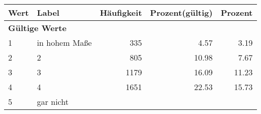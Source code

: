      \begin{longtable}{lXrrr}
     \toprule
     \textbf{Wert} & \textbf{Label} & \textbf{Häufigkeit} & \textbf{Prozent(gültig)} & \textbf{Prozent} \\
     \endhead
     \midrule
     \multicolumn{5}{l}{\textbf{Gültige Werte}}\\

     1 &
     \multicolumn{1}{X}{ in hohem Maße   } &


       \num{335} &
       \num[round-mode=places,round-precision=2]{4,57} &
         \num[round-mode=places,round-precision=2]{3,19} \\

     2 &
     \multicolumn{1}{X}{ 2   } &


       \num{805} &
       \num[round-mode=places,round-precision=2]{10,98} &
         \num[round-mode=places,round-precision=2]{7,67} \\

     3 &
     \multicolumn{1}{X}{ 3   } &


       \num{1179} &
       \num[round-mode=places,round-precision=2]{16,09} &
         \num[round-mode=places,round-precision=2]{11,23} \\

     4 &
     \multicolumn{1}{X}{ 4   } &


       \num{1651} &
       \num[round-mode=places,round-precision=2]{22,53} &
         \num[round-mode=places,round-precision=2]{15,73} \\

     5 &
     \multicolumn{1}{X}{ gar nicht   } &



\end{longtable}
